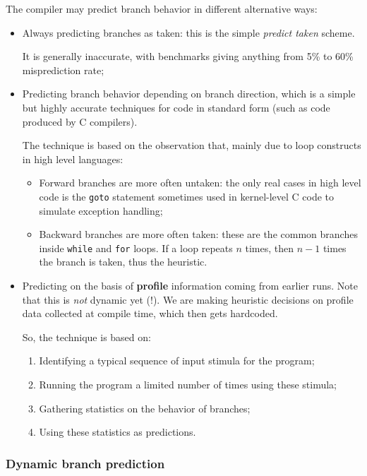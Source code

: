\documentclass[a4paper,11pt]{article}
\begin{document}
The compiler may predict branch behavior in different alternative ways:
\begin{itemize}
	\item Always predicting branches as taken: this is the simple \textit{predict taken} scheme.

	      It is generally inaccurate, with benchmarks giving anything from 5\% to 60\% misprediction rate;
	\item Predicting branch behavior depending on branch direction, which is a simple but highly accurate techniques for code in standard form (such as code produced by C compilers).

	      The technique is based on the observation that, mainly due to loop constructs in high level languages:
	      \begin{itemize}
		      \item Forward branches are more often untaken: the only real cases in high level code is the \texttt{goto} statement sometimes used in kernel-level C code to simulate exception handling;
		      \item Backward branches are more often taken: these are the common branches inside \texttt{while} and \texttt{for} loops. If a loop repeats $n$ times, then $n - 1$ times the branch is taken, thus the heuristic.
	      \end{itemize}

	\item Predicting on the basis of \textbf{profile} information coming from earlier runs.
	      Note that this is \textit{not} dynamic yet (!). We are making heuristic decisions on profile data collected at compile time, which then gets hardcoded.

	      So, the technique is based on:
	      \begin{enumerate}
		      \item Identifying a typical sequence of input stimula for the program;
		      \item Running the program a limited number of times using these stimula;
		      \item Gathering statistics on the behavior of branches;
		      \item Using these statistics as predictions.
	      \end{enumerate}
\end{itemize}

\subsubsection{Dynamic branch prediction}
\end{document}
